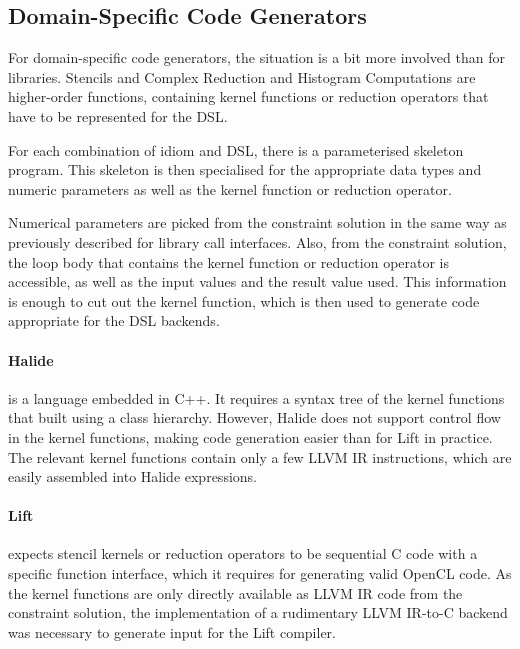 \subsection{Domain-Specific Code Generators}

    For domain-specific code generators, the situation is a bit more involved
    than for libraries.
    Stencils and Complex Reduction and Histogram Computations are higher-order
    functions, containing kernel functions or reduction operators that have to
    be represented for the DSL.

    For each combination of idiom and DSL, there is a parameterised
    skeleton program.
    This skeleton is then specialised for the appropriate data types and numeric
    parameters as well as the kernel function or reduction operator.

    Numerical parameters are picked from the constraint solution in the same way
    as previously described for library call interfaces.
    Also, from the constraint solution, the loop body that contains the kernel
    function or reduction operator is accessible, as well as the input values
    and the result value used.
    This information is enough to cut out the kernel function, which is then
    used to generate code appropriate for the DSL backends.

    \paragraph*{Halide}
    is a language embedded in C++.
    It requires a syntax tree of the kernel functions that built using a class
    hierarchy.
    However, Halide does not support control flow in the kernel functions,
    making code generation easier than for Lift in practice.
    The relevant kernel functions contain only a few LLVM IR instructions, which
    are easily assembled into Halide expressions.

    \paragraph*{Lift}
    expects stencil kernels or reduction operators to be sequential C code with
    a specific function interface, which it requires for generating valid
    OpenCL code.
    As the kernel functions are only directly available as LLVM IR code from the
    constraint solution, the implementation of a rudimentary LLVM IR-to-C
    backend was necessary to generate input for the Lift compiler.

